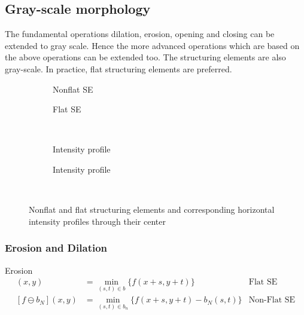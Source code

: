 \subsection{Gray-scale morphology}
The fundamental operations dilation, erosion, opening and closing can be extended to gray scale. Hence the more advanced operations which are based on the above operations can be extended too. The structuring elements are also gray-scale. In practice, flat structuring elements are preferred.

\begin{figure}[h!]
\centering
\begin{subfigure}[b]{0.45\textwidth}
\centering
{}
\caption{Nonflat SE}
\end{subfigure}
\begin{subfigure}[b]{0.45\textwidth}
\centering
{}
\caption{Flat SE}
\end{subfigure}\\
\begin{subfigure}[b]{0.45\textwidth}
\centering
{}
\caption{Intensity profile}
\end{subfigure}
\begin{subfigure}[b]{0.45\textwidth}
\centering
{}
\caption{Intensity profile}
\end{subfigure}\\
\caption{Nonflat and flat structuring elements and corresponding horizontal intensity profiles through their center}
\end{figure}

\subsubsection{Erosion and Dilation}
Erosion
\begin{align*}
	[f\ominus b](x,y)	&= \min_{(s,t)\in b} \{f(x+s,y+t)\}				& \text{Flat SE} \\
	[f\ominus b_N](x,y)	&= \min_{(s,t)\in b_n} \{f(x+s,y+t) -b_N(s,t)\}	& \text{Non-Flat SE}
\end{align*}


